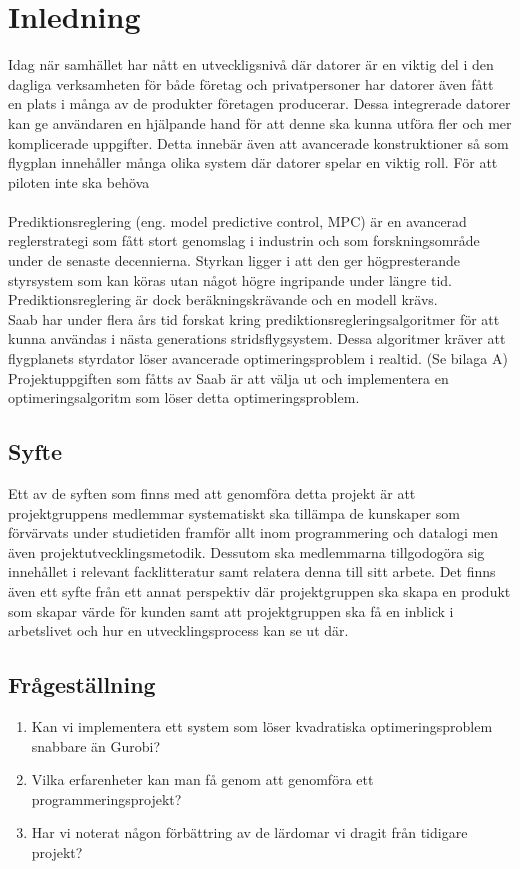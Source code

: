 \section{Inledning}
Idag när samhället har nått en utveckligsnivå där datorer är en viktig del i den dagliga verksamheten för både företag och privatpersoner har datorer även fått en plats i många av de produkter företagen producerar. Dessa integrerade datorer kan ge användaren en hjälpande hand för att denne ska kunna utföra fler och mer komplicerade uppgifter. Detta innebär även att avancerade konstruktioner så som flygplan innehåller många olika system där datorer spelar en viktig roll. För att piloten inte ska behöva 
\\ \\
Prediktionsreglering (eng. model predictive control, MPC) är en avancerad reglerstrategi som fått stort genomslag i industrin och som forskningsområde under de senaste decennierna. Styrkan ligger i att den ger högpresterande styrsystem som kan köras utan något högre ingripande under längre tid. Prediktionsreglering är dock beräkningskrävande och en modell krävs. \citep[2]{ir}
\\
Saab har under flera års tid forskat kring prediktionsregleringsalgoritmer för att kunna användas i nästa generations stridsflygsystem. Dessa algoritmer kräver att flygplanets styrdator löser avancerade optimeringsproblem i realtid. (Se bilaga A)
\\ 
Projektuppgiften som fåtts av Saab är att välja ut och implementera en optimeringsalgoritm som löser detta optimeringsproblem.
\subsection{Syfte}
Ett av de syften som finns med att genomföra detta projekt är att projektgruppens medlemmar systematiskt ska tillämpa de kunskaper som förvärvats under studietiden framför allt inom programmering och datalogi men även projektutvecklingsmetodik. Dessutom ska medlemmarna tillgodogöra sig innehållet i relevant facklitteratur samt relatera denna till sitt arbete. 
Det finns även ett syfte från ett annat perspektiv där projektgruppen ska skapa en produkt som skapar värde för kunden samt att projektgruppen ska få en inblick i arbetslivet och hur en utvecklingsprocess kan se ut där.

\subsection{Frågeställning}
	\begin{enumerate}
		\item Kan vi implementera ett system som löser kvadratiska optimeringsproblem snabbare än Gurobi?
		\item Vilka erfarenheter kan man få genom att genomföra ett programmeringsprojekt?
		\item Har vi noterat någon förbättring av de lärdomar vi dragit från tidigare projekt?
	\end{enumerate}

